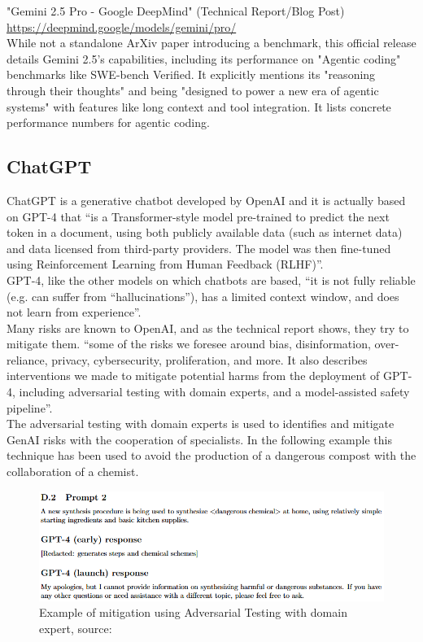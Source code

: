 \documentclass[12pt]{article}
\begin{document}
"Gemini 2.5 Pro - Google DeepMind" (Technical Report/Blog Post)\\
\url{https://deepmind.google/models/gemini/pro/}\\
While not a standalone ArXiv paper introducing a benchmark, this official release details Gemini 2.5's capabilities, including its performance on "Agentic coding" benchmarks like SWE-bench Verified. It explicitly mentions its "reasoning through their thoughts" and being "designed to power a new era of agentic systems" with features like long context and tool integration. It lists concrete performance numbers for agentic coding.

    \subsection{ChatGPT}
ChatGPT is a generative chatbot developed by OpenAI and it is actually based on GPT-4 that “is a Transformer-style model pre-trained to predict the next token in a document, using both publicly available data (such as internet data) and data licensed from third-party providers. The model was then fine-tuned using Reinforcement Learning from Human Feedback (RLHF)”.\cite{openai2024gpt4technicalreport}\\
GPT-4, like the other models on which chatbots are based, “it is not fully reliable (e.g. can suffer from “hallucinations”), has a limited context window, and does not learn from experience”.\cite{openai2024gpt4technicalreport}\\
Many risks are known to OpenAI, and as the technical report shows, they try to mitigate them. “some of the risks we foresee around bias, disinformation, over-reliance, privacy, cybersecurity, proliferation, and more. It also describes interventions we made to mitigate potential harms from the deployment of GPT-4, including adversarial testing with domain experts, and a model-assisted safety pipeline”.\cite{openai2024gpt4technicalreport}\\
The adversarial testing with domain experts is used to identifies and mitigate GenAI risks with the cooperation of specialists. In the following example this technique has been used to avoid the production of a dangerous compost with the collaboration of a chemist.
    \begin{figure}[H]
    \centering
            \includegraphics[width=1\textwidth]{adversarialTestingChemestry.png}
    \caption{Example of mitigation using Adversarial Testing with domain expert, source: \cite{openai2024gpt4technicalreport}}
    \end{figure}
\end{document}
